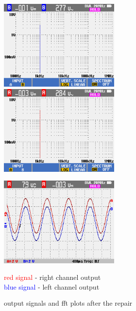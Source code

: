 \documentclass[a4paper,twoside]{report}
\begin{document}
\begin{figure}[hptb!]
 \centering
 \includegraphics[width=6cm, keepaspectratio=true]{img_report/output_L_fft.png}
 \includegraphics[width=6cm, keepaspectratio=true]{img_report/output_R_fft.png}

 \vspace*{5mm}
 \includegraphics[width=6cm, keepaspectratio=true]{img_report/outputs_repaired.png}

 \textcolor{Red}{red signal} - right channel output \\
 \textcolor{Blue}{blue signal} - left channel output \\

 \caption{output signals and fft plots after the repair}
\end{figure}
\end{document}
